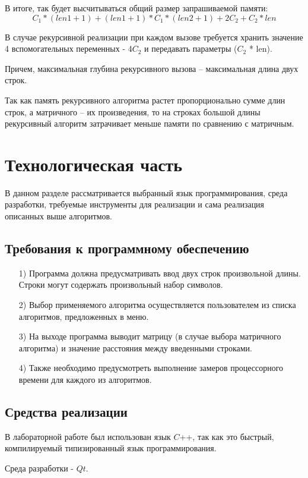 \documentclass[12pt]{report}
\begin{document}
В итоге, так будет высчитываться общий размер запрашиваемой памяти:
$$C_1 * (len1 + 1) + (len1 + 1) * C_1 * (len2 + 1) + 2C_2 + C_2 * len $$

В случае рекурсивной реализации при каждом вызове требуется хранить значение 4 вспомогательных переменных - 4$C_2$ 
и передавать параметры ($C_2$ * len).

Причем, максимальная глубина рекурсивного вызова – максимальная длина двух строк.

Так как память рекурсивного алгоритма растет пропорционально сумме длин строк, а
матричного – их произведения, то на строках большой длины рекурсивный алгоритм затрачивает меньше памяти по сравнению с матричным.

\chapter{Технологическая часть}
В данном разделе рассматривается выбранный язык программирования, среда разработки, требуемые инструменты для реализации и сама реализация описанных выше алгоритмов.


\section{Требования к программному обеспечению}
\begin{enumerate}
	\item[1)] Программа должна предусматривать ввод двух строк произвольной длины. Строки
	могут содержать произвольный набор символов.
	\item[2)] Выбор применяемого алгоритма осуществляется пользователем из списка алгоритмов,
	предложенных в меню.
	\item[3)] На выходе программа выводит матрицу (в случае выбора матричного алгоритма) и
	значение расстояния между введенными строками.
	\item[4)] Также необходимо предусмотреть выполнение замеров процессорного времени для
	каждого из алгоритмов.

\end{enumerate}

\section{Средства реализации}
В лабораторной работе был использован язык $C$++, так как это быстрый, компилируемый типизированный язык программирования.

Среда разработки - $Qt$.
\end{document}
